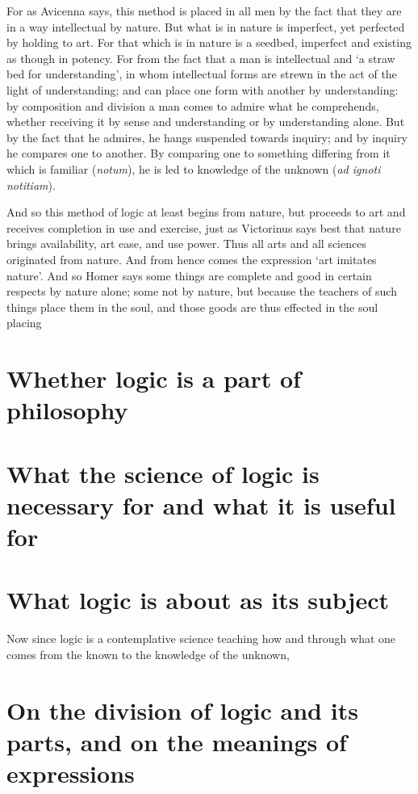 \documentclass[]{article}
\begin{document}
For as Avicenna says, this method is placed in all men by the fact that they are in a way intellectual by nature. But what is in nature is imperfect, yet perfected by holding to art. For that which is in nature is a seedbed, imperfect and existing as though in potency. For from the fact that a man is intellectual and `a straw bed for understanding', in whom intellectual forms are strewn in the act of the light of understanding; and can place one form with another by understanding: by composition and division a man comes to admire what he comprehends, whether receiving it by sense and understanding or by understanding alone. But by the fact that he admires, he hangs suspended towards inquiry; and by inquiry he compares one to another. By comparing one to something differing from it which is familiar (\textit{notum}), he is led to knowledge of the unknown (\textit{ad ignoti notitiam}). 

And so this method of logic at least begins from nature, but proceeds to art and receives completion in use and exercise, just as Victorinus says best that nature brings availability, art ease, and use power. Thus all arts and all sciences originated from nature. And from hence comes the expression `art imitates nature'. And so Homer says some things are complete and good in certain respects by nature alone; some not by nature, but because the teachers of such things place them in the soul, and those goods are thus effected in the soul placing 
\section{Whether logic is a part of philosophy}
\section{What the science of logic is necessary for and what it is useful for}
\section{What logic is about as its subject}
Now since logic is a contemplative science teaching how and through what one comes from the known to the knowledge of the unknown, 
\section{On the division of logic and its parts, and on the meanings of expressions}
\end{document}
